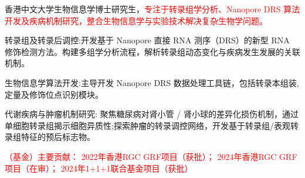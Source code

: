 

\begin{cvparagraph}

香港中文大学生物信息学博士研究生，\textcolor{red}{专注于转录组学分析、Nanopore DRS 算法开发及疾病机制研究，整合生物信息学与实验技术解决复杂生物学问题。}

\begin{cvitems} %
    \item {转录组及转录后调控:开发基于 Nanopore 直接 RNA 测序（DRS）的新型 RNA 修饰检测方法。构建多组学分析流程，解析转录组动态变化与疾病发生发展的关联机制。}
    \item {生物信息学算法开发:主导开发 Nanopore DRS 数据处理工具链，包括转录本组装, 定量及修饰位点识别模块。 }
    \item {代谢疾病与肿瘤机制研究: 聚焦糖尿病对肾小管 / 肾小球的差异化损伤机制，通过单细胞转录组揭示细胞异质性;探索肿瘤的转录调控网络，开发基于转录组/表观转录组特征的预后标志物。}
    \item {\textcolor{red}{（基金）主要贡献： 2022年香港RGC GRF项目（获批）； 2024年香港RGC GRF项目（在审）； 2024年1+1+1联合基金项目（获批）}}
\end{cvitems}


\end{cvparagraph}